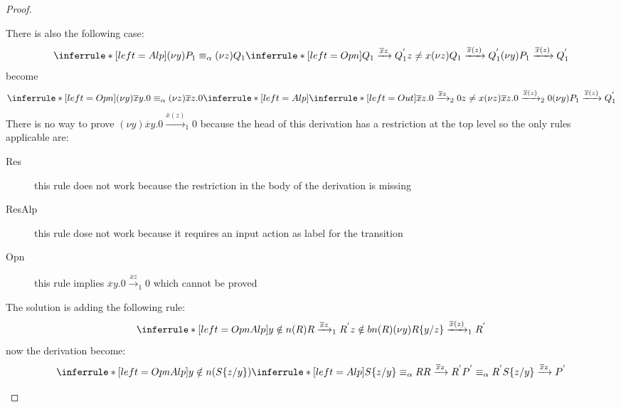 \begin{proof}
\begin{description}
\begin{itemize}
\begin{description}
\[{	      }
	    \]
	    There is also the following case:
	    \[
	      \inferrule* [left=Alp]{
		  (\nu y) P_{1} \equiv_{\alpha} (\nu z) Q_{1} 
		\\
		  \inferrule* [left=Opn]{
		      Q_{1} \xrightarrow{\overline{x}z} Q_{1}^{'}
		    \\
		      z\neq x
		  }{
		    (\nu z) Q_{1} \xrightarrow{\overline{x}(z)} Q_{1}^{'}
		  }
	      }{
		(\nu y) P_{1} \xrightarrow{\overline{x}(z)} Q_{1}^{'}
	      }
	    \]
	    become
	    \[
	      \inferrule* [left=Opn]{
		  (\nu y) \overline{x}y.0 \equiv_{\alpha} (\nu z) \overline{x}z.0
		\\
		  \inferrule* [left=Alp]{
		      \inferrule* [left=Out]{
		      }{
			\overline{x}z.0 \xrightarrow{\overline{x}z}_{2} 0
		      }
		    \\
		      z\neq x
		  }{
		    (\nu z) \overline{x}z.0 \xrightarrow{\overline{x}(z)}_{2} 0
		  }
	      }{
		(\nu y) P_{1} \xrightarrow{\overline{x}(z)} Q_{1}^{'}
	      }
	    \]
	    There is no way to prove $(\nu y) \overline{x}y.0 \xrightarrow{\overline{x}(z)}_{1} 0$ because the head of this derivation has a restriction at the top level so the only rules applicable are:
	    \begin{description}
	      \item[Res]
		this rule does not work because the restriction in the body of the derivation is missing
	      \item[ResAlp]
		this rule dose not work because it requires an input action as label for the transition
	      \item[Opn]
		this rule implies $\overline{x}y.0 \xrightarrow{\overline{x}z}_{1} 0$ which cannot be proved
	    \end{description}
	    The solution is adding the following rule:
	    \[
	      \inferrule* [left=OpnAlp]{
		  y\notin n(R)
		\\
		  R\xrightarrow{\overline{x}z}_{1}R^{'}
		\\
		  z\notin bn(R)
	      }{
		(\nu y)R\{y/z\}\xrightarrow{\overline{x}(z)}_{1}R^{'}
	      }
	    \]
	    now the derivation become:
	    \[
	      \inferrule* [left=OpnAlp]{
		  y\notin n(S\{z/y\})
		\\
		  \inferrule* [left=Alp]{
		      S\{z/y\} \equiv_{\alpha} R
		    \\
		      R \xrightarrow{\overline{x}z} R^{'}
		    \\
		      P^{'} \equiv_{\alpha} R^{'}
		  }{
		    S\{z/y\} \xrightarrow{\overline{x}z} P^{'}
		  }
		\\
}\]
\end{description}
\end{itemize}
\end{description}
\end{proof}
